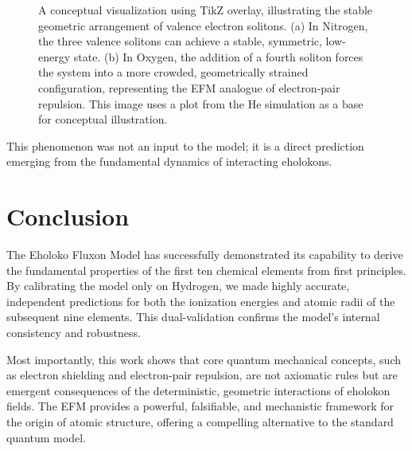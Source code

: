 \documentclass[11pt]{article}
\begin{document}
\begin{figure}[h!]
    \centering
    \caption{A conceptual visualization using TikZ overlay, illustrating the stable geometric arrangement of valence electron solitons. (a) In Nitrogen, the three valence solitons can achieve a stable, symmetric, low-energy state. (b) In Oxygen, the addition of a fourth soliton forces the system into a more crowded, geometrically strained configuration, representing the EFM analogue of electron-pair repulsion. This image uses a plot from the He simulation as a base for conceptual illustration.}
    \label{fig:valence_fields}
\end{figure}

This phenomenon was not an input to the model; it is a direct prediction emerging from the fundamental dynamics of interacting eholokons.

\section{Conclusion}
The Eholoko Fluxon Model has successfully demonstrated its capability to derive the fundamental properties of the first ten chemical elements from first principles. By calibrating the model only on Hydrogen, we made highly accurate, independent predictions for both the ionization energies and atomic radii of the subsequent nine elements. This dual-validation confirms the model's internal consistency and robustness.

Most importantly, this work shows that core quantum mechanical concepts, such as electron shielding and electron-pair repulsion, are not axiomatic rules but are emergent consequences of the deterministic, geometric interactions of eholokon fields. The EFM provides a powerful, falsifiable, and mechanistic framework for the origin of atomic structure, offering a compelling alternative to the standard quantum model.
\end{document}
